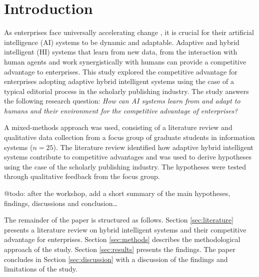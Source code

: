 \section{Introduction}
\label{sec:introduction}

As enterprises face universally accelerating change \citep{eliazarUniversalityAcceleratingChange2018}, it
is crucial for their artificial intelligence (AI) systems to be dynamic and adaptable. Adaptive and hybrid
intelligent (HI) systems that learn from new data, from the interaction with human agents and work
synergistically with humans can provide a competitive advantage to enterprises. This study explored the
competitive advantage for enterprises adopting adaptive hybrid intelligent systems using the case of a
typical editorial process in the scholarly publishing industry. The study answers the following research
question: \textit{How can AI systems learn from and adapt to humans and their environment for the
competitive advantage of enterprises?}

A mixed-methods approach was used, consisting of a literature review and qualitative data collection from
a focus group of graduate students in information systems ($n = 25$). The literature review identified how 
adaptive hybrid intelligent systems contribute to competitive advantages and was used to derive hypotheses
using the case of the scholarly publishing industry. The hypotheses were tested through qualitative feedback
from the focus group.

{\color{purple} @todo: after the workshop, add a short summary of the main hypotheses, findings, 
discussions and conclusion\dots}

The remainder of the paper is structured as follows. Section \ref{sec:literature} presents a literature review
on hybrid intelligent systems and their competitive advantage for enterprises. Section \ref{sec:methods} describes
the methodological approach of the study. Section \ref{sec:results} presents the findings. The paper concludes in
Section \ref{sec:discussion} with a discussion of the findings and limitations of the study.